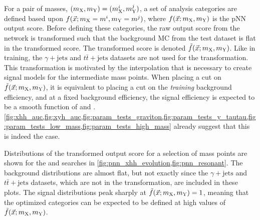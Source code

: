 For a pair of masses, $(m_{\mathrm{X}},m_{\mathrm{Y}}) = (m_{\mathrm{X}}^i, m_{\mathrm{Y}}^j)$, a set of analysis categories are defined based upon $f(\vec{x}; m_{\mathrm{X}}=m^i, m_{\mathrm{Y}}=m^j)$, where $f(\vec{x}; m_{\mathrm{X}}, m_{\mathrm{Y}})$ is the pNN output score. Before defining these categories, the raw output score from the network is transformed such that the background MC from the test dataset is flat in the transformed score. The transformed score is denoted $\tilde{f}(\vec{x}; m_{\mathrm{X}}, m_{\mathrm{Y}})$. Like in training, the $\gamma + \text{jets}$ and $t\bar{t} + \text{jets}$ datasets are not used for the transformation. This transformation is motivated by the interpolation that is necessary to create signal models for the intermediate mass points. When placing a cut on $\tilde{f}(\vec{x}; m_{\mathrm{X}}, m_{\mathrm{Y}})$, it is equivalent to placing a cut on the \textit{training} background efficiency, and at a fixed background efficiency, the signal efficiency is expected to be a smooth function of \mX and \mY. \cref{fig:xhh_auc,fig:xyh_auc,fig:param_tests_graviton,fig:param_tests_y_tautau,fig:param_tests_low_mass,fig:param_tests_high_mass} already suggest that this is indeed the case. 

Distributions of the transformed output score for a selection of mass points are shown for the \XHH and \XYH searches in \cref{fig:pnn_xhh_evolution,fig:pnn_resonant}. The background distributions are almost flat, but not exactly since the $\gamma + \text{jets}$ and $t\bar{t} + \text{jets}$ datasets, which are not in the transformation, are included in these plots. The signal distributions peak sharply at $\tilde{f}(\vec{x}; m_{\mathrm{X}}, m_{\mathrm{Y}})=1$, meaning that the optimized categories can be expected to be defined at high values of $\tilde{f}(\vec{x}; m_{\mathrm{X}}, m_{\mathrm{Y}})$.


